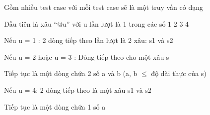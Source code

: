 Gồm nhiều test case với mỗi test case sẽ là một truy vấn có dạng

Đầu tiên là xâu “@u” với u lần lượt là 1 trong các số 1 2 3 4

Nếu u = 1 : 2 dòng tiếp theo lần lượt là 2 xâu: s1 và s2

Nếu u = 2 hoặc u = 3 : Dòng tiếp theo cho một xâu s

Tiếp tục là một dòng chứa 2 số a và b (a, b  $\le$  độ dài thực của s)

Nếu u = 4: 2 dòng tiếp theo là một xâu s1 và s2

Tiếp tục là một dòng chứa 1 số a